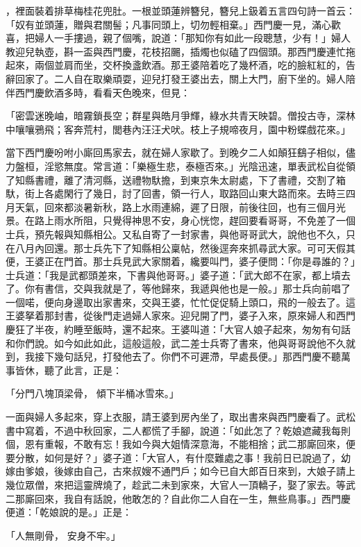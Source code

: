 \begin{showcontents}{}
，裡面裝着排草梅桂花兜肚。一根並頭蓮辨簪兒，簪兒上鈒着五言四句詩一首云：「奴有並頭蓮，贈與君關髻；凡事同頭上，切勿輕相棄。」西門慶一見，滿心歡喜，把婦人一手摟過，親了個嘴，說道：「那知你有如此一段聰慧，少有！」婦人教迎兒執壺，斟一盃與西門慶，花枝招颺，插燭也似磕了四個頭。那西門慶連忙拖起來，兩個並肩而坐，交杯換盞飲酒。那王婆陪着吃了幾杯酒，吃的臉紅紅的，告辭回家了。二人自在取樂頑耍，迎兒打發王婆出去，關上大門，廚下坐的。婦人陪伴西門慶飲酒多時，看看天色晚來，但見：

「密雲迷晚岫，暗霧鎖長空；群星與皓月爭輝，綠水共青天映碧。僧投古寺，深林中嚷嚷鴉飛；客奔荒村，閭巷內汪汪犬吠。枝上子規啼夜月，園中粉蝶戲花來。」

當下西門慶吩咐小廝回馬家去，就在婦人家歇了。到晚夕二人如顛狂鷂子相似，儘力盤桓，淫慾無度。常言道：「樂極生悲，泰極否來。」光陰迅速，單表武松自從領了知縣書禮，離了清河縣，送禮物馱擔，到東京朱太尉處，下了書禮，交割了箱馱，街上各處閑行了幾日，討了回書，領一行人，取路回山東大路而來。去時三四月天氣，回來都淡暑新秋，路上水雨連綿，遲了日限，前後往回，也有三個月光景。在路上雨水所阻，只覺得神思不安，身心恍惚，趕回要看哥哥，不免差了一個士兵，預先報與知縣相公。又私自寄了一封家書，與他哥哥武大，說他也不久，只在八月內回還。那士兵先下了知縣相公稟帖，然後逕奔來抓尋武大家。可可天假其便，王婆正在門首。那士兵見武大家關着，纔要叫門，婆子便問：「你是尋誰的？」士兵道：「我是武都頭差來，下書與他哥哥。」婆子道：「武大郎不在家，都上墳去了。你有書信，交與我就是了，等他歸來，我遞與他也是一般。」那士兵向前唱了一個喏，便向身邊取出家書來，交與王婆，忙忙促促騎上頭口，飛的一般去了。這王婆拏着那封書，從後門走過婦人家來。迎兒開了門，婆子入來，原來婦人和西門慶狂了半夜，約睡至飯時，還不起來。王婆叫道：「大官人娘子起來，匆匆有句話和你們說。如今如此如此，這般這般，武二差士兵寄了書來，他與哥哥說他不久就到，我接下幾句話兒，打發他去了。你們不可遲滯，早處長便。」那西門慶不聽萬事皆休，聽了此言，正是：

「分門八塊頂梁骨，  傾下半桶冰雪來。」

一面與婦人多起來，穿上衣服，請王婆到房內坐了，取出書來與西門慶看了。武松書中寫着，不過中秋回家，二人都慌了手腳，說道：「如此怎了？乾娘遮藏我每則個，恩有重報，不敢有忘！我如今與大姐情深意海，不能相捨；武二那廝回來，便要分散，如何是好？」婆子道：「大官人，有什麼難處之事！我前日已說過了，幼嫁由爹娘，後嫁由自己，古來叔嫂不通門戶；如今已自大郎百日來到，大娘子請上幾位眾僧，來把這靈牌燒了，趁武二未到家來，大官人一頂轎子，娶了家去。等武二那廝回來，我自有話說，他敢怎的？自此你二人自在一生，無些鳥事。」西門慶便道：「乾娘說的是。」正是：

「人無剛骨，  安身不牢。」


\end{showcontents}
